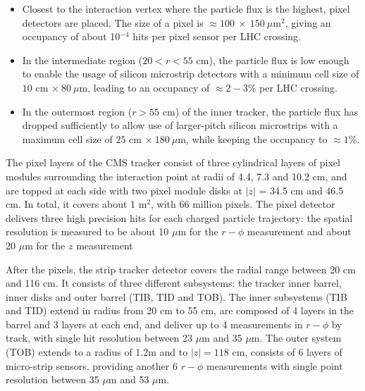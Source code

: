 \begin{itemize}
\item  Closest to the interaction vertex where the particle flux is the highest, pixel detectors are placed. The size of a pixel is $\approx 100~\times~150 ~\mu$m$^{2}$, giving an occupancy of about 10$^{-4}$ hits per pixel sensor per LHC crossing.
\item In the intermediate region ($20 < r < 55$ cm), the particle flux is low enough to enable the usage of silicon microstrip detectors with a minimum cell size of $10$ cm $\times~80~\mu$m, leading to an occupancy of $\approx 2-3\%$ per LHC crossing.
\item In the outermost region ($r > 55$ cm) of the inner tracker, the particle flux has dropped sufficiently to allow use of larger-pitch silicon microstrips with a maximum cell size of $25$ cm $\times~180~\mu$m, while keeping the occupancy to $\approx 1\%$.
\end{itemize}

The pixel layers of the CMS tracker consist of three cylindrical layers of pixel modules surrounding the interaction point at radii of 4.4, 7.3 and 10.2 cm, and are topped at each side with two pixel module disks at $|z|$ = 34.5 cm and 46.5 cm. 
In total, it covers about 1 m$^{2}$, with 66 million pixels. 
The pixel detector delivers three high precision hits for each charged particle trajectory: the spatial resolution is measured to be about 10 $\mu$m for the $r-\phi$ measurement and about 20 $\mu$m for the $z$ measurement

After the pixels, the strip tracker detector covers the radial range between 20 cm and 116 cm. 
It consists of three different subsystems: the tracker inner barrel, inner disks and outer barrel (TIB, TID and TOB). 
The inner subsystems (TIB and TID) extend in radius from 20 cm to 55 cm, are composed of 4 layers in the barrel and 3 layers at each end, and deliver up to 4 measurements in $r-\phi$ by track, with single hit resolution between 23 $\mu$m and 35 $\mu$m. 
The outer system (TOB) extends to a radius of 1.2m and to $|z| = 118$ cm, consists of 6 layers of micro-strip sensors, providing another 6 $r-\phi$ measurements with single point resolution between 35 $\mu$m and 53 $\mu$m. 

